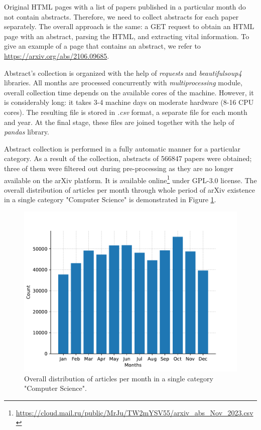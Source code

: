 \documentclass{article}
\begin{document}
        Original HTML pages with a list of papers published in a particular month do not contain abstracts. Therefore, we need to collect abstracts for each paper separately. The overall approach is the same: a GET request to obtain an HTML page with an abstract, parsing the HTML, and extracting vital information. To give an example of a page that contains an abstract, we refer to \url{https://arxiv.org/abs/2106.09685}.

        Abstract's collection is organized with the help of \textit{requests} and \textit{beautifulsoup4} libraries. All months are processed concurrently with \textit{multiprocessing} module, overall collection time depends on the available cores of the machine. However, it is considerably long: it takes 3-4 machine days on moderate hardware (8-16 CPU cores). The resulting file is stored in \textit{.csv} format, a separate file for each month and year. At the final stage, these files are joined together with the help of \textit{pandas} library.

        Abstract collection is performed in a fully automatic manner for a particular category. As a result of the collection, abstracts of 566847 papers were obtained; three of them were filtered out during pre-processing as they are no longer available on the arXiv platform. It is available online\footnote{\url{https://cloud.mail.ru/public/MrJu/TW2mYSV55/arxiv_abs_Nov_2023.csv}} under GPL-3.0 license. The overall distribution of articles per month through whole period of arXiv existence in a single category "Computer Science" is demonstrated in Figure \ref{fig:articles-bars}.

        \begin{figure}[H]
            \centering
            \includegraphics[width=0.8\linewidth]{img/number_of_articles_by_month.pdf}
            \caption{Overall distribution of articles per month in a single category "Computer Science".}
            \label{fig:articles-bars}
        \end{figure}
\end{document}
